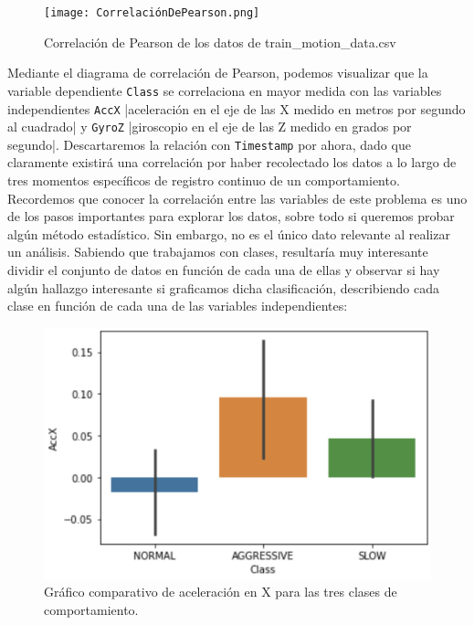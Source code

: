 \documentclass[spanish,12pt,letterpaper]{article}
\begin{document}
    \begin{figure}[H]
        \centering
        \texttt{[image: CorrelaciónDePearson.png]}
        \caption{Correlación de Pearson de los datos de train\_motion\_data.csv}
        \label{fig:comand}%
    \end{figure}

\textsc Mediante el diagrama de correlación de Pearson, podemos visualizar que la variable dependiente \verb|Class| se correlaciona en mayor medida con las variables independientes \verb|AccX| |aceleración en el eje de las X medido en metros por segundo al cuadrado| y \verb|GyroZ| |giroscopio en el eje de las Z medido en grados por segundo|. Descartaremos la relación con \verb|Timestamp| por ahora, dado que claramente existirá una correlación por haber recolectado los datos a lo largo de tres momentos específicos de registro continuo de un comportamiento.\\

\textsc Recordemos que conocer la correlación entre las variables de este problema es uno de los pasos importantes para explorar los datos, sobre todo si queremos probar algún método estadístico. Sin embargo, no es el único dato relevante al realizar un análisis. Sabiendo que trabajamos con clases, resultaría muy interesante dividir el conjunto de datos en función de cada una de ellas y observar si hay algún hallazgo interesante si graficamos dicha clasificación, describiendo cada clase en función de cada una de las variables independientes:  \\

    \begin{figure}[H]
        \centering
        \includegraphics[width=1\columnwidth]{AccX.png}
        \caption{Gráfico comparativo de aceleración en X para las tres clases de comportamiento.}
        \label{fig:comand}%
    \end{figure}
\end{document}
